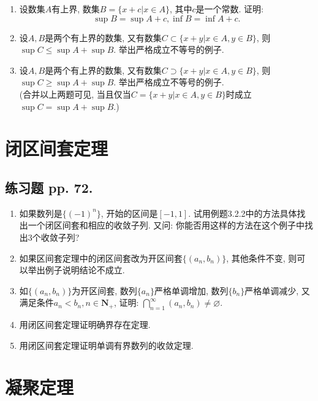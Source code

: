 \documentclass[a4paper,11pt,twoside]{ctexbook}
\begin{document}
\begin{enumerate}
	\item 设数集$A$有上界, 数集$B=\{x+c|x\in A\}$, 其中$c$是一个常数. 证明:
	      \[
		      \sup{B}=\sup{A}+c, \inf{B}=\inf{A}+c.
	      \]

	\item 设$A,B$是两个有上界的数集, 又有数集$C\subset\{x+y|x\in A, y\in B\}$, 则$\sup{C}\leqslant\sup{A}+\sup{B}$. 举出严格成立不等号的例子.

	\item 设$A,B$是两个有上界的数集, 又有数集$C\supset\{x+y|x\in A, y\in B\}$, 则$\sup{C}\geqslant\sup{A}+\sup{B}$. 举出严格成立不等号的例子.\\

	      (合并以上两题可见, 当且仅当$C=\{x+y|x\in A, y\in B\}$时成立$\sup{C}=\sup{A}+\sup{B}$.)
\end{enumerate}

\section{闭区间套定理}
\subsection{练习题 pp. 72.}
\begin{enumerate}
	\item 如果数列是$\{(-1)^n\}$, 开始的区间是$[-1,1]$. 试用例题3.2.2中的方法具体找出一个闭区间套和相应的收敛子列. 又问: 你能否用这样的方法在这个例子中找出$3$个收敛子列?

	\item 如果区间套定理中的闭区间套改为开区间套$\{(a_n,b_n)\}$, 其他条件不变, 则可以举出例子说明结论不成立.

	\item 如$\{(a_n,b_n)\}$为开区间套, 数列$\{a_n\}$严格单调增加, 数列$\{b_n\}$严格单调减少, 又满足条件$a_n<b_n, n\in\mathbf{N}_{+}$, 证明: $\bigcap_{n=1}^{\infty}(a_n,b_n)\neq\varnothing$.

	\item 用闭区间套定理证明确界存在定理.

	\item 用闭区间套定理证明单调有界数列的收敛定理.
\end{enumerate}

\section{凝聚定理}
\end{document}
